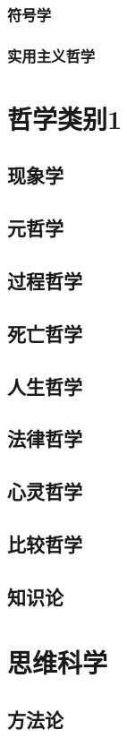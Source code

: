 \documentclass[UTF8]{../RepresentationUniverse}
\begin{document}
    \subsection{符号学}
    \subsection{实用主义哲学}
    

    \chapter{哲学类别1}

    \section{现象学}
    \section{元哲学}
    \section{过程哲学}
    \section{死亡哲学}
    \section{人生哲学}
    \section{法律哲学}
    \section{心灵哲学}
    \section{比较哲学}
    \section{知识论}


    
\chapter{思维科学}
\section{方法论}
\end{document}
